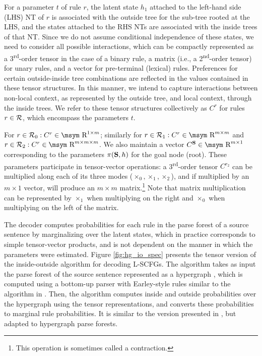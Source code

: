 \documentclass[11pt]{article}
\newcommand{\ts}{\textsuperscript}
\newcommand{\rules}{{\cal R}}
\newcommand{\bS}{{\bf S}}
\newcommand{\reals}{\mbox{\msym R}}
\begin{document}
For a parameter $t$ of rule $r$, the latent state $h_1$ attached to the left-hand side (LHS) NT of $r$ is associated with the outside tree for the sub-tree rooted at the LHS, and the states attached to the RHS NTs are associated with the inside trees of that NT.    
Since we do not assume conditional independence of these states, we need to consider all possible interactions, which can be compactly represented as a 3\ts{rd}-order tensor in the case of a binary rule, a matrix (i.e., a 2\ts{nd}-order tensor) for unary rules, and a vector for pre-terminal (lexical) rules.  
Preferences for certain outside-inside tree combinations are reflected in the values contained in these tensor structures.  
In this manner, we intend to capture interactions between non-local context, as represented by the outside tree, and local context, through the inside trees. 
We refer to these tensor structures collectively as $C^r$ for rules $r \in \rules$, which encompass the parameters $t$.  

For $r \in \rules_0: C^r \in \reals^{1 \times m}$; similarly for $r \in \rules_1: C^r \in \reals^{m \times m}$ and $r \in \rules_2: C^r \in \reals^{m \times m \times m}$.
We also maintain a vector $C^\bS \in \reals^{m \times 1}$ corresponding to the parameters $\pi(\bS, h)$ for the goal node (root).   
These parameters participate in tensor-vector operations: a 3\ts{rd}-order tensor $C^{r_2}$ can be multiplied along each of its three modes ($\times_0, \times_1, \times_2$), and if multiplied by an $m \times 1$ vector, will produce an $m \times m$ matrix.\footnote{This operation is sometimes called a contraction.}
Note that matrix multiplication can be represented by $\times_1$ when multiplying on the right and $\times_0$ when multiplying on the left of the matrix.  

The decoder computes probabilities for each rule in the parse forest of a source sentence by marginalizing over the latent states, which in practice corresponds to simple tensor-vector products, and is not dependent on the manner in which the parameters were estimated. 
Figure \ref{fig:hg_io_spec} presents the tensor version of the inside-outside algorithm for decoding L-SCFGs. 
The algorithm takes as input the parse forest of the source sentence represented as a hypergraph \cite{Klein2001}, which is computed using a bottom-up parser with Earley-style rules similar to the algorithm in .  
Then, the algorithm computes inside and outside probabilities over the hypergraph using the tensor representations, and converts these probabilities to marginal rule probabilities.  
It is similar to the version presented in , but adapted to hypergraph parse forests. 
 
\end{document}
